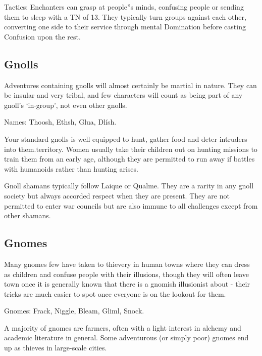 	Tactics: Enchanters can grasp at people''s minds, confusing people or sending them to sleep with a TN of 13.  They typically turn groups against each other, converting one side to their service through mental Domination before casting Confusion upon the rest.

\subsection{Gnolls}

Adventures containing gnolls will almost certainly be martial in nature.  They can be insular and very tribal, and few characters will count as being part of any gnoll's `in-group', not even other gnolls.

	Names: Thoosh, Ethsh, Glua, Dl\'{i}sh.

\label{gnoll_hunter}
\gnollhunter

Your standard gnolls is well equipped to hunt, gather food and deter intruders into them.territory.  Women usually take their children out on hunting missions to train them from an early age, although they are permitted to run away if battles with humanoids rather than hunting arises.

\label{gnoll_shaman}
\gnollshaman 

Gnoll shamans typically follow Laique or Qualme.  They are a rarity in any gnoll society but always accorded respect when they are present.  They are not permitted to enter war councils but are also immune to all challenges except from other shamans.

\subsection{Gnomes}

Many gnomes few have taken to thievery in human towns where they can dress as children and confuse people with their illusions, though they will often leave town once it is generally known that there is a gnomish illusionist about - their tricks are much easier to spot once everyone is on the lookout for them.

	Gnomes: Frack, Niggle, Bleam, Gliml, Snock.

\label{gnomish_citizen}
\gnome

A majority of gnomes are farmers, often with a light interest in alchemy and academic literature in general.  Some adventurous (or simply poor) gnomes end up as thieves in large-scale cities.

